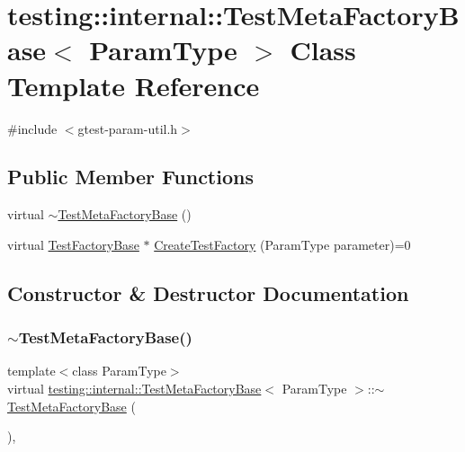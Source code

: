 \hypertarget{classtesting_1_1internal_1_1TestMetaFactoryBase}{}\section{testing\+:\+:internal\+:\+:Test\+Meta\+Factory\+Base$<$ Param\+Type $>$ Class Template Reference}
\label{classtesting_1_1internal_1_1TestMetaFactoryBase}


{\ttfamily \#include $<$gtest-\/param-\/util.\+h$>$}

\subsection*{Public Member Functions}
\begin{DoxyCompactItemize}
\item 
virtual \hyperlink{classtesting_1_1internal_1_1TestMetaFactoryBase_aad80adf04686f7dfcf952e44afc02767}{$\sim$\+Test\+Meta\+Factory\+Base} ()
\item 
virtual \hyperlink{classtesting_1_1internal_1_1TestFactoryBase}{Test\+Factory\+Base} $\ast$ \hyperlink{classtesting_1_1internal_1_1TestMetaFactoryBase_a853daab362740bcac55e180128d564ef}{Create\+Test\+Factory} (Param\+Type parameter)=0
\end{DoxyCompactItemize}


\subsection{Constructor \& Destructor Documentation}
\mbox{\label{classtesting_1_1internal_1_1TestMetaFactoryBase_aad80adf04686f7dfcf952e44afc02767}} 
\subsubsection{\texorpdfstring{$\sim$\+Test\+Meta\+Factory\+Base()}{~TestMetaFactoryBase()}}
{\footnotesize\ttfamily template$<$class Param\+Type$>$ \\
virtual \hyperlink{classtesting_1_1internal_1_1TestMetaFactoryBase}{testing\+::internal\+::\+Test\+Meta\+Factory\+Base}$<$ Param\+Type $>$\+::$\sim$\hyperlink{classtesting_1_1internal_1_1TestMetaFactoryBase}{Test\+Meta\+Factory\+Base} (\begin{DoxyParamCaption}{ }\end{DoxyParamCaption})\hspace{0.3cm}{\ttfamily [inline]}, {\ttfamily [virtual]}}



